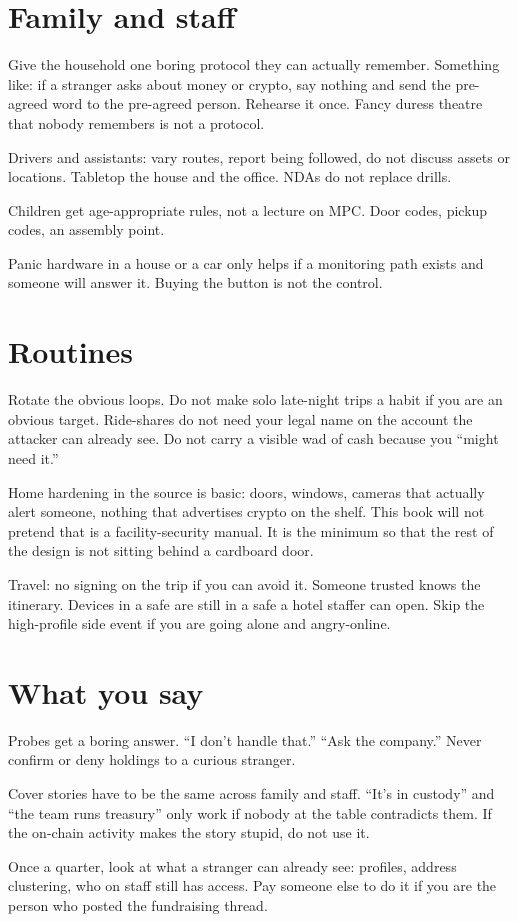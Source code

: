 \section{Family and staff}

Give the household one boring protocol they can actually
remember. Something like: if a stranger asks about money
or crypto, say nothing and send the pre-agreed word to
the pre-agreed person. Rehearse it once. Fancy duress
theatre that nobody remembers is not a protocol.

Drivers and assistants: vary routes, report being
followed, do not discuss assets or locations. Tabletop
the house and the office. NDAs do not replace drills.

Children get age-appropriate rules, not a lecture on
MPC. Door codes, pickup codes, an assembly point.

Panic hardware in a house or a car only helps if a
monitoring path exists and someone will answer it. Buying
the button is not the control.

\section{Routines}

Rotate the obvious loops. Do not make solo late-night
trips a habit if you are an obvious target. Ride-shares
do not need your legal name on the account the attacker
can already see. Do not carry a visible wad of cash
because you ``might need it.''

Home hardening in the source is basic: doors, windows,
cameras that actually alert someone, nothing that
advertises crypto on the shelf. This book will not pretend
that is a facility-security manual. It is the minimum so
that the rest of the design is not sitting behind a
cardboard door.

Travel: no signing on the trip if you can avoid it.
Someone trusted knows the itinerary. Devices in a safe
are still in a safe a hotel staffer can open. Skip the
high-profile side event if you are going alone and
angry-online.

\section{What you say}

Probes get a boring answer. ``I don't handle that.''
``Ask the company.'' Never confirm or deny holdings to a
curious stranger.

Cover stories have to be the same across family and
staff. ``It's in custody'' and ``the team runs treasury''
only work if nobody at the table contradicts them. If the
on-chain activity makes the story stupid, do not use it.

Once a quarter, look at what a stranger can already see:
profiles, address clustering, who on staff still has
access. Pay someone else to do it if you are the person
who posted the fundraising thread.
